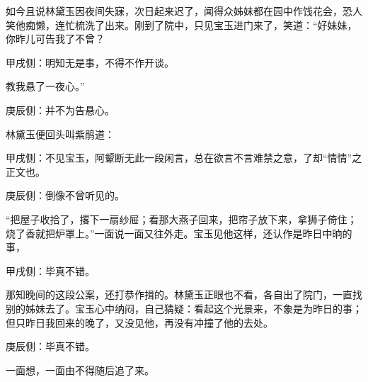 \begin{parag}
    如今且说林黛玉因夜间失寐，次日起来迟了，闻得众姊妹都在园中作饯花会，恐人笑他痴懒，连忙梳洗了出来。刚到了院中，只见宝玉进门来了，笑道：“好妹妹，你昨儿可告我了不曾？\begin{note}甲戌侧：明知无是事，不得不作开谈。\end{note}教我悬了一夜心。”\begin{note}庚辰侧：并不为告悬心。\end{note}林黛玉便回头叫紫鹃道：\begin{note}甲戌侧：不见宝玉，阿颦断无此一段闲言，总在欲言不言难禁之意，了却“情情”之正文也。\end{note}\begin{note}庚辰侧：倒像不曾听见的。\end{note}“把屋子收拾了，撂下一扇纱屉；看那大燕子回来，把帘子放下来，拿狮子倚住；烧了香就把炉罩上。”一面说一面又往外走。宝玉见他这样，还认作是昨日中晌的事，\begin{note}甲戌侧：毕真不错。\end{note}那知晚间的这段公案，还打恭作揖的。林黛玉正眼也不看，各自出了院门，一直找别的姊妹去了。宝玉心中纳闷，自己猜疑：看起这个光景来，不象是为昨日的事；但只昨日我回来的晚了，又没见他，再没有冲撞了他的去处。\begin{note}庚辰侧：毕真不错。\end{note}一面想，一面由不得随后追了来。
\end{parag}


